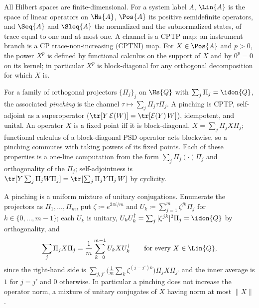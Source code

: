 
\begin{definition}\label{def:pinching}
All Hilbert spaces are finite-dimensional. For a system label $A$,
$\Lin{A}$ is the space of linear operators on $\Hs{A}$, $\Pos{A}$ its
positive semidefinite operators, and $\Seq{A}$ and $\Sleq{A}$ the
normalized and the subnormalized states, of trace equal to one and at most
one. A channel is a CPTP map; an instrument branch is a CP
trace-non-increasing (CPTNI) map. For $X\in\Pos{A}$ and $p>0$, the power
$X^{p}$ is defined by functional calculus on the support of $X$ and by $0^p=0$
on its kernel; in particular $X^{p}$ is block-diagonal for any orthogonal
decomposition for which $X$ is.

For a family of orthogonal projectors $\{\Pi_j\}_{j}$ on $\Hs{Q}$ with
$\sum_j\Pi_j=\idon{Q}$, the associated \emph{pinching} is the channel
$\tau\mapsto\sum_j\Pi_j\tau\Pi_j$. A pinching is CPTP, self-adjoint as a
superoperator ($\tr[Y\,\mathcal{E}(W)]=\tr[\mathcal{E}(Y)\,W]$), idempotent,
and unital. An operator $X$ is a fixed point iff it is block-diagonal,
$X=\sum_j\Pi_jX\Pi_j$; functional calculus of a block-diagonal PSD operator
acts blockwise, so a pinching commutes with taking powers of its fixed
points. Each of these properties is a one-line computation from the form
$\sum_j\Pi_j(\cdot)\Pi_j$ and orthogonality of the $\Pi_j$;
self-adjointness is
$\tr[Y\sum_j\Pi_jW\Pi_j]=\tr[\sum_j\Pi_jY\Pi_j\,W]$ by cyclicity.

A pinching is a uniform mixture of unitary conjugations. Enumerate the
projectors as $\Pi_1,\dots,\Pi_m$, put $\zeta\coloneqq e^{2\pi i/m}$ and
$U_k\coloneqq\sum_{j=1}^{m}\zeta^{jk}\Pi_j$ for $k\in\{0,\dots,m-1\}$; each
$U_k$ is unitary, $U_kU_k^{\dagger}=\sum_j|\zeta^{jk}|^2\Pi_j=\idon{Q}$ by
orthogonality, and
\begin{equation}\label{eq:pinch-unitary-mixture}
  \sum_{j}\Pi_j X\Pi_j=\frac1m\sum_{k=0}^{m-1}U_kXU_k^{\dagger}
  \qquad\text{for every }X\in\Lin{Q},
\end{equation}
since the right-hand side is
$\sum_{j,j'}\big(\frac1m\sum_k\zeta^{(j-j')k}\big)\Pi_jX\Pi_{j'}$ and the
inner average is $1$ for $j=j'$ and $0$ otherwise. In particular a pinching
does not increase the operator norm, a mixture of unitary conjugates of $X$
having norm at most $\|X\|$.
\end{definition}

